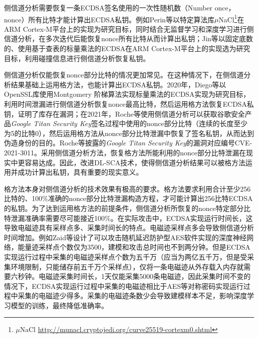 {	侧信道分析需要恢复一条ECDSA签名使用的一次性随机数（Number once， nonce）所有比特才能计算出ECDSA私钥。例如Perin等\citep{Perin20}以特定算法库$\mu$NaCl\footnote{$\mu$NaCl \href{http://munacl.cryptojedi.org/curve25519-cortexm0.shtml}{http://munacl.cryptojedi.org/curve25519-cortexm0.shtml}}在ARM Cortex-M平台上的实现为研究目标，同时结合无监督学习和深度学习进行侧信道分析，在多次迭代后能恢复nonce所有比特从而计算出私钥；Jin等\citep{Jin21}以固定底数的、使用基于查表的标量乘法的ECDSA在ARM Cortex-M平台上的实现选为研究目标，利用碰撞信息进行侧信道分析恢复私钥。
	
	侧信道分析仅能恢复nonce部分比特的情况更加常见。在这种情况下，在侧信道分析结果基础上运用格方法，也能计算出ECDSA私钥。2020年，Diego等\citep{Diego20}以OpenSSL库使用Montgomery 阶梯算法\citep{Cohen05,Blake05}实现标量乘法的ECDSA实现为研究目标，利用时间泄漏进行侧信道分析恢复nonce最高比特，然后运用格方法恢复ECDSA私钥，证明了库存在漏洞；在2021年，Roche等\citep{Roche21}使用侧信道分析可以获取谷歌安全产品\textit{Google Titan Security Key}\citep{Titan}签名过程中使用的nonce部分比特（连续的长度至少为5的比特0），然后运用格方法从nonce部分比特泄漏中恢复了签名私钥，从而达到伪造身份的目的。Roche等\citep{Roche21}披露的\textit{Google Titan Security Key}的漏洞对应编号CVE-2021-3011。采用侧信道分析方法，恢复格方法所能利用的nonce部分比特泄漏在现实中更容易达成。因此，改进DL-SCA技术，使得侧信道分析结果可以被格方法运用并成功计算出私钥，具有重要的现实意义。
	
	格方法本身对侧信道分析的技术效果有极高的要求。格方法要求利用合计至少256比特的、100\%准确的nonce部分比特泄漏构造方程，才可能计算出256比特ECDSA的私钥。为了达到运用格方法的前提条件，侧信道分析所恢复的nonce特定部分比特泄漏准确率需要尽可能接近100\%。在实际攻击中，ECDSA实现运行时间长，这导致电磁迹具有采样点多、采集时间长的特点。电磁迹采样点多会导致侧信道分析时间增加。例如Zaid等\citep{Zaid20}设计了可以攻击随机延迟防护型AES软件实现的深度神经网络，能量迹采样点个数仅为3500，建模和攻击总时间也不到两分钟。但是ECDSA实现运行过程中采集的电磁迹采样点个数为五千万（应当为两亿五千万，但是受采集环境限制，只能储存前五千万个采样点），仅将一条电磁迹从外存载入内存就需要六秒钟。电磁迹采集时间长，1天仅能采集5000条电磁迹，因此采集时间不变的情况下，ECDSA实现运行过程中采集的电磁迹相比于AES等对称密码实现运行过程中采集的电磁迹少得多。采集的电磁迹条数少会导致建模样本不足，影响深度学习模型的训练，最终降低准确率。

}
